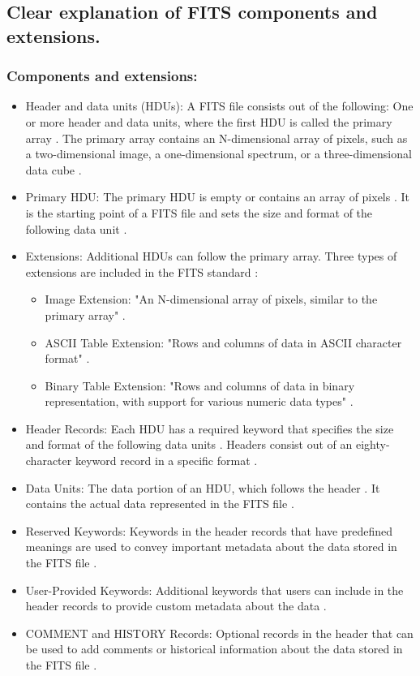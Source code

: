 \documentclass[a4paper,oneside,11pt]{book}
\begin{document}
\subsection{Clear explanation of FITS components and extensions.}
\subsubsection{Components and extensions:}
\begin{itemize}
    \item Header and data units (HDUs): A FITS file consists out of the following: One or more header and data units, where the first HDU is called the primary array \citep{fits_3}. The primary array contains an N-dimensional array of pixels, such as a two-dimensional image, a one-dimensional spectrum, or a three-dimensional data cube \citep{fits_3}.
    \item Primary HDU: The primary HDU is empty or contains an array of pixels \citep{fits_3}. It is the starting point of a FITS file and sets the size and format of the following data unit \citep{fits_3}.
    \item Extensions: Additional HDUs can follow the primary array. Three types of extensions are included in the FITS standard \citep{nasa_fits_overview}:
    \begin{itemize}
        \item Image Extension: "An N-dimensional array of pixels, similar to the primary array" \citep{pence2010definition}.

        \item ASCII Table Extension: "Rows and columns of data in ASCII character format" \citep{pence2010definition}.
        
        \item Binary Table Extension: "Rows and columns of data in binary representation, with support for various numeric data types" \citep{pence2010definition}.
    \end{itemize}
    \item Header Records: Each HDU has a required keyword that specifies the size and format of the following data units \citep{fits_3}. Headers consist out of an eighty-character keyword record in a specific format \citep{fits_3}.
    \item Data Units: The data portion of an HDU, which follows the header \citep{fits_3}. It contains the actual data represented in the FITS file \citep{fits_3}.
    \item Reserved Keywords: Keywords in the header records that have predefined meanings are used to convey important metadata about the data stored in the FITS file \citep{fits_3}.
    \item User-Provided Keywords: Additional keywords that users can include in the header records to provide custom metadata about the data \citep{fits_3}.
    \item COMMENT and HISTORY Records: Optional records in the header that can be used to add comments or historical information about the data stored in the FITS file \citep{fits_3}.
\end{itemize}
\end{document}
